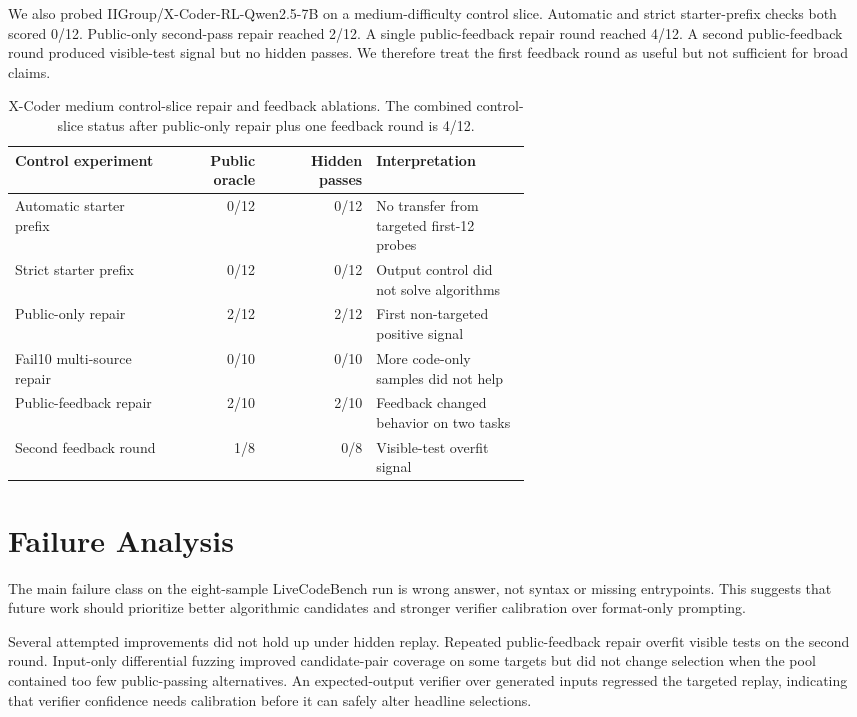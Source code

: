 \documentclass[11pt]{article}
\begin{document}
We also probed IIGroup/X-Coder-RL-Qwen2.5-7B on a medium-difficulty control
slice. Automatic and strict starter-prefix checks both scored 0/12. Public-only
second-pass repair reached 2/12. A single public-feedback repair round reached
4/12. A second public-feedback round produced visible-test signal but no hidden
passes. We therefore treat the first feedback round as useful but not sufficient
for broad claims.

\begin{table}[H]
\centering
\small
\begin{tabular}{>{\raggedright\arraybackslash}p{0.30\linewidth}rr
                >{\raggedright\arraybackslash}p{0.30\linewidth}}
\toprule
Control experiment & Public oracle & Hidden passes & Interpretation \\
\midrule
Automatic starter prefix & 0/12 & 0/12 & No transfer from targeted first-12 probes \\
Strict starter prefix & 0/12 & 0/12 & Output control did not solve algorithms \\
Public-only repair & 2/12 & 2/12 & First non-targeted positive signal \\
Fail10 multi-source repair & 0/10 & 0/10 & More code-only samples did not help \\
Public-feedback repair & 2/10 & 2/10 & Feedback changed behavior on two tasks \\
Second feedback round & 1/8 & 0/8 & Visible-test overfit signal \\
\bottomrule
\end{tabular}
\caption{X-Coder medium control-slice repair and feedback ablations. The
combined control-slice status after public-only repair plus one feedback round
is 4/12.}
\label{tab:xcoder-ablation}
\end{table}

\section{Failure Analysis}

The main failure class on the eight-sample LiveCodeBench run is wrong answer,
not syntax or missing entrypoints. This suggests that future work should
prioritize better algorithmic candidates and stronger verifier calibration over
format-only prompting.

Several attempted improvements did not hold up under hidden replay. Repeated
public-feedback repair overfit visible tests on the second round. Input-only
differential fuzzing improved candidate-pair coverage on some targets but did
not change selection when the pool contained too few public-passing alternatives. An
expected-output verifier over generated inputs regressed the targeted replay,
indicating that verifier confidence needs calibration before it can safely alter
headline selections.
\end{document}
